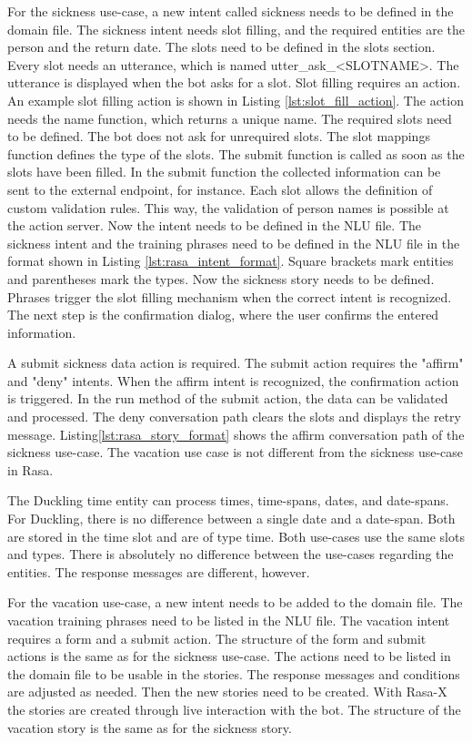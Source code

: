 For the sickness use-case, a new intent called sickness needs to be defined in the domain file.
The sickness intent needs slot filling, and the required entities are the 
person and the return date. 
The slots need to be defined in the slots section.
Every slot needs an utterance, which is named utter\_ask\_<SLOTNAME>.
The utterance is displayed when the bot asks for a slot.
Slot filling requires an action.
An example slot filling action is shown in Listing \ref{lst:slot_fill_action}.
The action needs the name function, which returns a unique name.
The required slots need to be defined.
The bot does not ask for unrequired slots.
The slot mappings function defines the type of the slots.
The submit function is called as soon as the slots have been filled.
In the submit function the collected information can be sent to the 
external endpoint, for instance.
Each slot allows the definition of custom validation rules.
This way, the validation of person names is possible at the action server.
Now the intent needs to be defined in the NLU file.
The sickness intent and the training phrases need to be defined in the 
NLU  file in the format shown in Listing \ref{lst:rasa_intent_format}.
Square brackets mark entities and parentheses mark the types.
Now the sickness story needs to be defined.
Phrases trigger the slot filling mechanism when the correct intent is recognized.
The next step is the confirmation dialog, where the user confirms the entered information.

A submit sickness data action is required.
The submit action requires the "affirm" and "deny" intents.
When the affirm intent is recognized, the confirmation action is triggered.
In the run method of the submit action, the data can be validated and processed.
The deny conversation path clears the slots and displays the retry message.
Listing\ref{lst:rasa_story_format} shows the affirm conversation path of the sickness use-case.
The vacation use case is not different from the sickness use-case in Rasa.

The Duckling time entity can process times, time-spans, dates, and date-spans.
For Duckling, there is no difference between a single date and a date-span.
Both are stored in the time slot and are of type time.
Both use-cases use the same slots and types.
There is absolutely no difference between the use-cases regarding the entities.
The response messages are different, however.

For the vacation use-case, a new intent needs to be added to the domain file.
The vacation training phrases need to be listed in the NLU file.
The vacation intent requires a form and a submit action.
The structure of the form and submit actions is the same as for the sickness use-case.
The actions need to be listed in the domain file to be usable in the stories.
The response messages and conditions are adjusted as needed.
Then the new stories need to be created.
With Rasa-X the stories are created through live interaction with the bot.
The structure of the vacation story is the same as for the sickness story.



